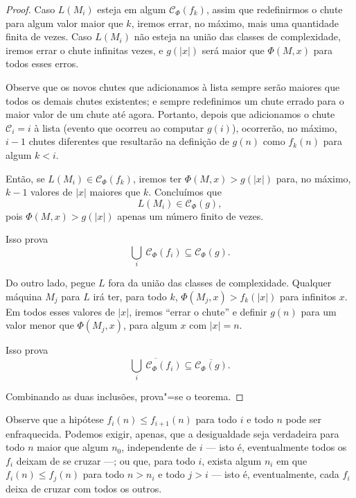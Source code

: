 \begin{proof}
    Caso $L(M_i)$ esteja em algum $\mathcal C_\Phi(f_k)$,
    assim que redefinirmos o chute para algum valor maior que $k$,
    iremos errar, no máximo,
    mais uma quantidade finita de vezes.
    Caso $L(M_i)$ não esteja na união das classes de complexidade,
    iremos errar o chute infinitas vezes,
    e $g(|x|)$ será maior que $\Phi(M, x)$ para todos esses erros.

    Observe que os novos chutes que adicionamos à lista
    sempre serão maiores que todos os demais chutes existentes;
    e sempre redefinimos um chute errado
    para o maior valor de um chute até agora.
    Portanto, depois que adicionamos o chute
    $\mathcal C_i = i$ à lista
    (evento que ocorreu ao computar $g(i)$),
    ocorrerão, no máximo,
    $i-1$ chutes diferentes
    que resultarão na definição de $g(n)$ como $f_k(n)$
    para algum $k < i$.

    Então, se $L(M_i) \in \mathcal C_\Phi(f_k)$,
    iremos ter $\Phi(M, x) > g(|x|)$
    para, no máximo, $k-1$ valores de $|x|$ maiores que $k$.
    Concluímos que
    \begin{equation*}
        L(M_i) \in \mathcal C_\Phi(g),
    \end{equation*}
    pois $\Phi(M, x) > g(|x|)$ apenas um número finito de vezes.

    Isso prova
    \begin{equation*}
        \bigcup_i \ \mathcal C_\Phi(f_i) \subseteq \mathcal C_\Phi(g).
    \end{equation*}

    Do outro lado,
    pegue $L$ fora da união das classes de complexidade.
    Qualquer máquina $M_j$ para $L$
    irá ter, para todo $k$,
    $\Phi(M_j, x) > f_k(|x|)$ para infinitos $x$.
    Em todos esses valores de $|x|$,
    iremos ``errar o chute''
    e definir $g(n)$
    para um valor menor que $\Phi(M_j, x)$,
    para algum $x$ com $|x| = n$.

    Isso prova
    \begin{equation*}
        \overline{\bigcup_i \ \mathcal C_\Phi(f_i)}
        \subseteq \overline{\mathcal C_\Phi(g)}.
    \end{equation*}

    Combinando as duas inclusões, prova"=se o teorema.
\end{proof}

Observe que a hipótese $f_i(n) \leq f_{i+1}(n)$
para todo $i$ e todo $n$
pode ser enfraquecida.
Podemos exigir, apenas,
que a desigualdade seja verdadeira para todo $n$
maior que algum $n_0$,
independente de $i$
--- isto é, eventualmente todos os $f_i$
deixam de se cruzar
---;
ou que, para todo $i$,
exista algum $n_i$ em que
$f_i(n) \leq f_j(n)$ para todo $n > n_i$
e todo $j > i$
--- isto é, eventualmente,
cada $f_i$ deixa de cruzar com todos os outros.

